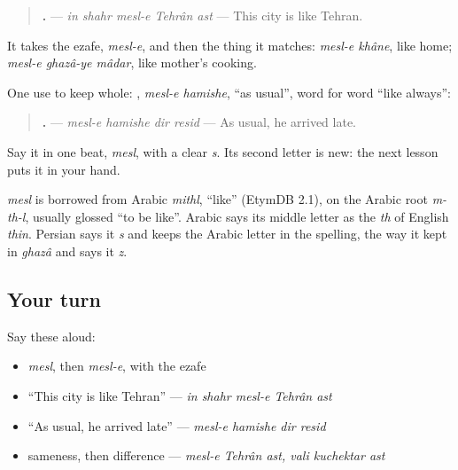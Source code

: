 \begin{quote}
\textbf{    .} — \emph{in shahr mesl-e Tehrân ast} — This city is like Tehran.
\end{quote}

It takes the ezafe, \emph{mesl-e}, and then the thing it matches: \emph{mesl-e khâne}, like home; \emph{mesl-e ghazâ-ye mâdar}, like mother's cooking.

One use to keep whole: \textbf{ }, \emph{mesl-e hamishe}, \textquotedblleft{}as usual\textquotedblright{}, word for word \textquotedblleft{}like always\textquotedblright{}:

\begin{quote}
\textbf{   .} — \emph{mesl-e hamishe dir resid} — As usual, he arrived late.
\end{quote}

Say it in one beat, \emph{mesl}, with a clear \emph{s}. Its second letter is new: the next lesson puts it in your hand.

\begin{cousinweb}
\emph{mesl} is borrowed from Arabic \emph{mithl}, \textquotedblleft{}like\textquotedblright{} (EtymDB 2.1), on the Arabic root \emph{m-th-l}, usually glossed \textquotedblleft{}to be like\textquotedblright{}. Arabic says its middle letter as the \emph{th} of English \emph{thin}. Persian says it \emph{s} and keeps the Arabic letter in the spelling, the way it kept \textbf{} in \emph{ghazâ} and says it \emph{z}.
\end{cousinweb}

\subsection*{Your turn}
Say these aloud:

\begin{itemize}
\raggedright
  \item \emph{mesl}, then \emph{mesl-e}, with the ezafe
  \item \textquotedblleft{}This city is like Tehran\textquotedblright{} — \emph{in shahr mesl-e Tehrân ast}
  \item \textquotedblleft{}As usual, he arrived late\textquotedblright{} — \emph{mesl-e hamishe dir resid}
  \item sameness, then difference — \emph{mesl-e Tehrân ast, vali kuchektar ast}
\end{itemize}

